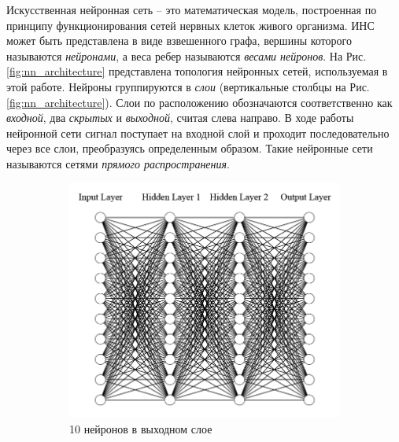 \documentclass[a4paper,12pt]{article}
\theoremstyle{remark}
\begin{document}
	Искусственная нейронная сеть -- это математическая модель, построенная по принципу функционирования сетей нервных клеток живого организма. ИНС может быть представлена в виде взвешенного графа, вершины которого называются \textit{нейронами}, а веса ребер называются \textit{весами нейронов}. На Рис. \ref{fig:nn_architecture} представлена топология нейронных сетей, используемая в этой работе. Нейроны группируются в \textit{слои} (вертикальные столбцы на Рис. \ref{fig:nn_architecture}). Слои по расположению обозначаются соответственно как \textit{входной}, два \textit{скрытых} и \textit{выходной}, считая слева направо. В ходе работы нейронной сети сигнал поступает на входной слой и проходит последовательно через все слои, преобразуясь определенным образом. Такие нейронные сети называются сетями \textit{прямого распространения}.
	\begin{figure}[h]
		\begin{subfigure}{0.5\textwidth}
			\includegraphics[width=\linewidth]{nn_architecture1.png}
			\caption{10 нейронов в выходном слое}
		\end{subfigure}
		\begin{subfigure}{0.5\textwidth}

\end{subfigure}
\end{figure}
\end{document}
